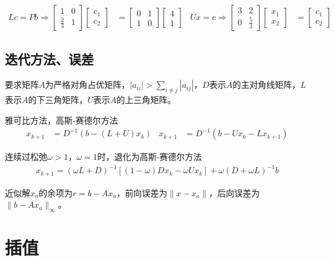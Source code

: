 \documentclass[twocolumn]{article}
\begin{document}
\begin{align*}
    Lc=Pb\Rightarrow
    \begin{bmatrix}
        1           & 0 \\
        \frac{2}{3} & 1
    \end{bmatrix}
    \begin{bmatrix}
        c_1 \\
        c_2
    \end{bmatrix}
     & =
    \begin{bmatrix}
        0 & 1 \\
        1 & 0
    \end{bmatrix}
    \begin{bmatrix}
        4 \\
        1
    \end{bmatrix}
     &
    Ux=c \Rightarrow
    \begin{bmatrix}
        3 & 2           \\
        0 & \frac{5}{3}
    \end{bmatrix}
    \begin{bmatrix}
        x_1 \\
        x_2
    \end{bmatrix}
     & =
    \begin{bmatrix}
        c_1 \\
        c_2
    \end{bmatrix}
\end{align*}

\subsection{迭代方法、误差}
要求矩阵$A$为严格对角占优矩阵，$|a_{ii}|>\sum_{i\neq j}|a_{ij}|$，$D$表示$A$的主对角线矩阵，$L$表示$A$的下三角矩阵，$U$表示$A$的上三角矩阵。

雅可比方法，高斯-赛德尔方法
\begin{align*}
    x_{k+1}&=D^{-1}(b-(L+U)x_k)&    x_{k+1}&=D^{-1}(b-Ux_k-Lx_{k+1})
\end{align*}

连续过松弛$\omega>1$，$\omega=1$时，退化为高斯-赛德尔方法
\begin{align*}
    x_{k+1}=(\omega L+D)^{-1}[(1-\omega)Dx_k-\omega Ux_k]+\omega(D+\omega L)^{-1}b
\end{align*}

近似解$x_a$的余项为$r=b-Ax_a$，前向误差为$\|x-x_a\|$，后向误差为$\|b-Ax_a\|_\infty$。

\section{插值}
\end{document}
